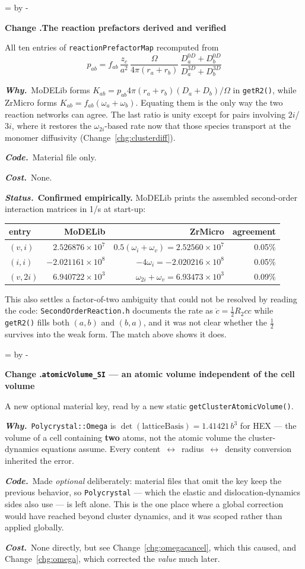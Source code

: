 \documentclass[11pt,a4paper]{article}
\newcommand{\code}[1]{\texttt{\small #1}}
\newcommand{\Om}{\ensuremath{\Omega}}
\newcommand{\needlines}[1]{%
  \par\dimen0=\pagegoal \advance\dimen0 by -\pagetotal
  \ifdim\dimen0<#1\baselineskip \newpage \fi}
\newcounter{chg}
\newcommand{\change}[1]{%
  \needlines{4}%
  \refstepcounter{chg}%
  \par\medskip\noindent
  {\bfseries\boldmath Change \thechg.\quad #1}%
  \par\nobreak\smallskip}
\newcommand{\why}[1]{\par\noindent\textbf{\itshape Why.}\ #1\par}
\newcommand{\impact}[1]{\par\noindent\textbf{\itshape Code.}\ #1\par}
\newcommand{\cost}[1]{\par\noindent\textbf{\itshape Cost.}\ #1\par}
\newcommand{\status}[1]{\par\noindent\textbf{\itshape Status.}\ #1\par}
\begin{document}
\change{The reaction prefactors derived and verified}
\label{chg:prefactors}
All ten entries of \code{reactionPrefactorMap} recomputed from
\[
  p_{ab} = f_{ab}\,\frac{z_c}{a^2}\,
           \frac{\Om}{4\pi(r_a+r_b)}\,
           \frac{D^{0D}_a+D^{0D}_b}{D^{3D}_a+D^{3D}_b}
\]
\why{MoDELib forms $K_{ab} = p_{ab}4\pi(r_a+r_b)(D_a+D_b)/\Om$ in
\code{getR2()}, while ZrMicro forms $K_{ab} = f_{ab}(\omega_a+\omega_b)$.
Equating them is the only way the two reaction networks can agree. The last
ratio is unity except for pairs involving $2i$/$3i$, where it restores the
$\omega_{2i}$-based rate now that those species transport at the monomer
diffusivity (Change~\ref{chg:clusterdiff}).}
\impact{Material file only.}
\cost{None.}
\status{\textbf{Confirmed empirically.} MoDELib prints the assembled
second-order interaction matrices in 1/s at start-up:

\begin{center}
\begin{tabular}{lrrr}
\toprule
entry & MoDELib & ZrMicro & agreement \\
\midrule
$(v,i)$  & $2.526876\times10^{7}$  & $0.5(\omega_i+\omega_v) = 2.52560\times10^{7}$ & 0.05\% \\
$(i,i)$  & $-2.021161\times10^{8}$ & $-4\omega_i = -2.020216\times10^{8}$ & 0.05\% \\
$(v,2i)$ & $6.940722\times10^{3}$  & $\omega_{2i}+\omega_v = 6.93473\times10^{3}$ & 0.09\% \\
\bottomrule
\end{tabular}
\end{center}

\noindent
This also settles a factor-of-two ambiguity that could not be resolved by
reading the code: \code{SecondOrderReaction.h} documents the rate as
$\dot c = \frac12 R_2 cc$ while \code{getR2()} fills both $(a,b)$ and $(b,a)$,
and it was not clear whether the $\frac12$ survives into the weak form. The
match above shows it does.}

\change{\code{atomicVolume\_SI} --- an atomic volume independent of the cell volume}
\label{chg:atomicvol}
A new optional material key, read by a new static
\code{getClusterAtomicVolume()}.
\why{\code{Polycrystal::Omega} is $\det(\text{latticeBasis}) = 1.41421\,b^3$
for HEX --- the volume of a cell containing \textbf{two} atoms, not the atomic
volume the cluster-dynamics equations assume. Every
content~$\leftrightarrow$~radius~$\leftrightarrow$~density conversion inherited
the error.}
\impact{Made \emph{optional} deliberately: material files that omit the key
keep the previous behavior, so \code{Polycrystal} --- which the elastic and
dislocation-dynamics sides also use --- is left alone. This is the one place
where a global correction would have reached beyond cluster dynamics, and it
was scoped rather than applied globally.}
\cost{None directly, but see Change~\ref{chg:omegacancel}, which this caused,
and Change~\ref{chg:omega}, which corrected the \emph{value} much later.}
\end{document}
